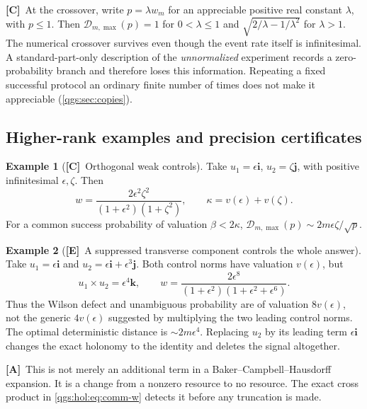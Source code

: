 \documentclass[11pt,oneside]{article}
\numberwithin{equation}{section}
\theoremstyle{plain}
\theoremstyle{definition}
\newtheorem{example}[example]{Example}
\theoremstyle{remark}
\newcommand{\TD}{\mathcal D}
\newcommand{\qi}{\mathbf i}
\newcommand{\qj}{\mathbf j}
\newcommand{\qk}{\mathbf k}
\newcommand{\TE}{\textcolor{TierE}{\textsf{\bfseries[E]}}}
\newcommand{\TC}{\textcolor{TierC}{\textsf{\bfseries[C]}}}
\newcommand{\TA}{\textcolor{TierA}{\textsf{\bfseries[A]}}}
\begin{document}
\TC\ At the crossover, write $p=\lambda w_m$ for an appreciable positive real constant $\lambda$, with $p\leq1$. Then $\TD_{m,\max}(p)=1$ for $0<\lambda\le1$ and $\sqrt{2/\lambda-1/\lambda^2}$ for $\lambda>1$. The numerical crossover survives even though the event rate itself is infinitesimal. A standard-part-only description of the \emph{unnormalized} experiment records a zero-probability branch and therefore loses this information. Repeating a fixed successful protocol an ordinary finite number of times does not make it appreciable (\cref{qgs:sec:copies}).

\subsection{Higher-rank examples and precision certificates}
\begin{example}[\TC\ Orthogonal weak controls]\label{qgs:hol:ex:orthogonal}
Take $u_1=\epsilon\qi$, $u_2=\zeta\qj$, with positive infinitesimal $\epsilon,\zeta$. Then
\[
 w=\frac{2\epsilon^2\zeta^2}{(1+\epsilon^2)(1+\zeta^2)},\qquad
 \kappa=v(\epsilon)+v(\zeta).
\]
For a common success probability of valuation $\beta<2\kappa$, $\TD_{m,\max}(p)\sim2m\epsilon\zeta/\sqrt p$.
\end{example}

\begin{example}[\TE\ A suppressed transverse component controls the whole answer]\label{qgs:hol:ex:aligned}
Take $u_1=\epsilon\qi$ and $u_2=\epsilon\qi+\epsilon^3\qj$. Both control norms have valuation $v(\epsilon)$, but
\[
 u_1\times u_2=\epsilon^4\qk,
 \qquad
 w=\frac{2\epsilon^8}{(1+\epsilon^2)(1+\epsilon^2+\epsilon^6)}.
\]
Thus the Wilson defect and unambiguous probability are of valuation $8v(\epsilon)$, not the generic $4v(\epsilon)$ suggested by multiplying the two leading control norms. The optimal deterministic distance is $\sim2m\epsilon^4$. Replacing $u_2$ by its leading term $\epsilon\qi$ changes the exact holonomy to the identity and deletes the signal altogether.
\end{example}

\TA\ This is not merely an additional term in a Baker--Campbell--Hausdorff expansion. It is a change from a nonzero resource to no resource. The exact cross product in \eqref{qgs:hol:eq:comm-w} detects it before any truncation is made.
\end{document}
